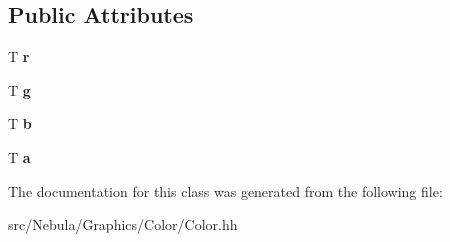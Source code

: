 \subsection*{Public Attributes}
\begin{DoxyCompactItemize}
\item 
\hypertarget{classNeb_1_1Color_1_1color_a8a18346bc363bf76e839492605e0a1f4}{T {\bfseries r}}\label{classNeb_1_1Color_1_1color_a8a18346bc363bf76e839492605e0a1f4}

\item 
\hypertarget{classNeb_1_1Color_1_1color_a681638c1b8b3e75508c654c3b356d07c}{T {\bfseries g}}\label{classNeb_1_1Color_1_1color_a681638c1b8b3e75508c654c3b356d07c}

\item 
\hypertarget{classNeb_1_1Color_1_1color_a7db460b59724724bbe4d1696a72bb3dc}{T {\bfseries b}}\label{classNeb_1_1Color_1_1color_a7db460b59724724bbe4d1696a72bb3dc}

\item 
\hypertarget{classNeb_1_1Color_1_1color_ad30391f20a88d4ea5be687113821be7e}{T {\bfseries a}}\label{classNeb_1_1Color_1_1color_ad30391f20a88d4ea5be687113821be7e}

\end{DoxyCompactItemize}


The documentation for this class was generated from the following file\-:\begin{DoxyCompactItemize}
\item 
src/\-Nebula/\-Graphics/\-Color/Color.\-hh\end{DoxyCompactItemize}
